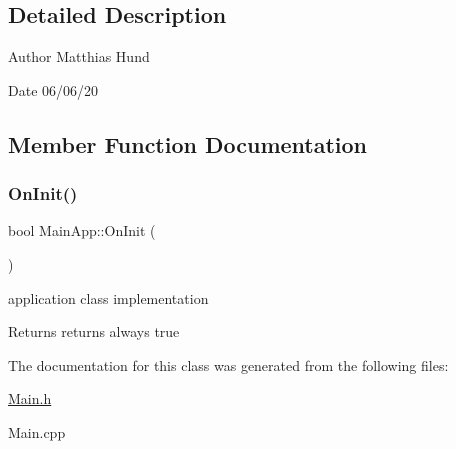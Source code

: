 \subsection{Detailed Description}
\begin{DoxyAuthor}{Author}
Matthias Hund 
\end{DoxyAuthor}
\begin{DoxyDate}{Date}
06/06/20 
\end{DoxyDate}


\subsection{Member Function Documentation}
\mbox{\label{classMainApp_aff3d398e1b61f1016c37d57798f86731}} 
\subsubsection{\texorpdfstring{On\+Init()}{OnInit()}}
{\footnotesize\ttfamily bool Main\+App\+::\+On\+Init (\begin{DoxyParamCaption}{ }\end{DoxyParamCaption})\hspace{0.3cm}{\ttfamily [virtual]}}



application class implementation 

\begin{DoxyReturn}{Returns}
returns always true 
\end{DoxyReturn}


The documentation for this class was generated from the following files\+:\begin{DoxyCompactItemize}
\item 
\hyperlink{Main_8h}{Main.\+h}\item 
Main.\+cpp\end{DoxyCompactItemize}
